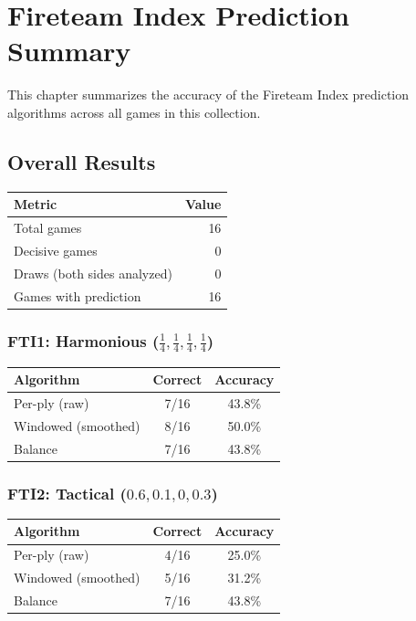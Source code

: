 \documentclass[11pt]{book}
\begin{document}
\chapter{Fireteam Index Prediction Summary}

This chapter summarizes the accuracy of the Fireteam Index prediction algorithms across all games in this collection.

\section{Overall Results}

\begin{tabular}{lr}
\toprule
\textbf{Metric} & \textbf{Value} \\
\midrule
Total games & 16 \\
Decisive games & 0 \\
Draws (both sides analyzed) & 0 \\
Games with prediction & 16 \\
\bottomrule
\end{tabular}

\subsection{FTI1: Harmonious ($\frac{1}{4}, \frac{1}{4}, \frac{1}{4}, \frac{1}{4}$)}

\begin{tabular}{lcc}
\toprule
\textbf{Algorithm} & \textbf{Correct} & \textbf{Accuracy} \\
\midrule
Per-ply (raw) & 7/16 & 43.8\% \\
Windowed (smoothed) & 8/16 & 50.0\% \\
Balance & 7/16 & 43.8\% \\
\bottomrule
\end{tabular}

\subsection{FTI2: Tactical ($0.6, 0.1, 0, 0.3$)}

\begin{tabular}{lcc}
\toprule
\textbf{Algorithm} & \textbf{Correct} & \textbf{Accuracy} \\
\midrule
Per-ply (raw) & 4/16 & 25.0\% \\
Windowed (smoothed) & 5/16 & 31.2\% \\
Balance & 7/16 & 43.8\% \\
\bottomrule
\end{tabular}
\end{document}
